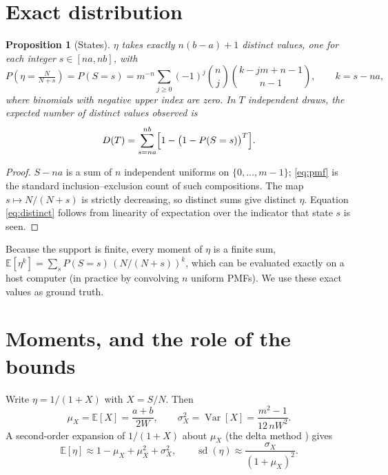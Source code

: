\documentclass[10pt,a4paper]{article}
\newtheorem{proposition}{Proposition}
\theoremstyle{definition}
\theoremstyle{remark}
\newcommand{\E}{\mathbb{E}}
\newcommand{\Var}{\operatorname{Var}}
\begin{document}
\section{Exact distribution}\label{sec:dist}

\begin{proposition}[States]\label{prop:states}
$\eta$ takes exactly $n(b-a)+1$ distinct values, one for each integer $s\in[na,nb]$, with
\begin{equation}
P\!\left(\eta=\tfrac{N}{N+s}\right)=P(S=s)
= m^{-n}\sum_{j\ge0}(-1)^j\binom{n}{j}\binom{k-jm+n-1}{n-1},\qquad k=s-na,
\label{eq:pmf}
\end{equation}
where binomials with negative upper index are zero. In $T$ independent draws, the expected
number of distinct values observed is
\begin{equation}
D(T)=\sum_{s=na}^{nb}\Bigl[1-\bigl(1-P(S=s)\bigr)^T\Bigr].
\label{eq:distinct}
\end{equation}
\end{proposition}
\begin{proof}
$S-na$ is a sum of $n$ independent uniforms on $\{0,\dots,m-1\}$; \eqref{eq:pmf} is the
standard inclusion--exclusion count of such compositions. The map $s\mapsto N/(N+s)$ is
strictly decreasing, so distinct sums give distinct $\eta$. Equation \eqref{eq:distinct}
follows from linearity of expectation over the indicator that state $s$ is seen.
\end{proof}

Because the support is finite, every moment of $\eta$ is a finite sum,
$\E[\eta^k]=\sum_s P(S=s)\,(N/(N+s))^k$, which can be evaluated exactly on a host computer
(in practice by convolving $n$ uniform PMFs). We use these exact values as ground truth.

\section{Moments, and the role of the bounds}\label{sec:ih}

Write $\eta=1/(1+X)$ with $X=S/N$. Then
\begin{equation}
\mu_X=\E[X]=\frac{a+b}{2W},\qquad
\sigma_X^2=\Var[X]=\frac{m^2-1}{12\,nW^2}.
\end{equation}
A second-order expansion of $1/(1+X)$ about $\mu_X$ (the delta method \cite{casella}) gives
\begin{equation}
\E[\eta]\approx 1-\mu_X+\mu_X^2+\sigma_X^2,\qquad
\operatorname{sd}(\eta)\approx\frac{\sigma_X}{(1+\mu_X)^2}.
\label{eq:approx}
\end{equation}
\end{document}
